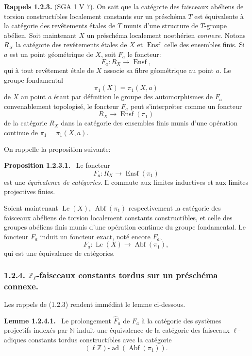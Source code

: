 \documentclass[11pt]{article}
\newenvironment{statement}[1]{\par\medskip\noindent\textbf{#1.}\ }{\par\medskip}
\providecommand{\Ensf}{\operatorname{Ensf}}
\providecommand{\Abf}{\operatorname{Abf}}
\providecommand{\Lc}{\operatorname{Lc}}
\providecommand{\ad}{\operatorname{ad}}
\begin{document}
\textbf{Rappels 1.2.3.} (SGA 1 V 7). On sait que la catégorie des faisceaux abéliens de torsion constructibles localement constants sur un préschéma \(T\) est équivalente à la catégorie des revêtements étales de \(T\) munis d'une structure de \(T\)-groupe abélien. Soit maintenant \(X\) un préschéma localement noethérien \emph{connexe}. Notons \(R_X\) la catégorie des revêtements étales de \(X\) et \(\Ensf\) celle des ensembles finis. Si \(a\) est un point géométrique de \(X\), soit \(F_a\) le foncteur:
\[
F_a:R_X\longrightarrow \Ensf,
\]
qui à
tout revêtement étale de \(X\) associe sa fibre géométrique au point \(a\). Le groupe fondamental
\[
\pi_1(X)=\pi_1(X,a)
\]
de \(X\) au point \(a\) étant par définition le groupe des automorphismes de \(F_a\) convenablement topologisé, le foncteur \(F_a\) peut s'interpréter comme un foncteur
\[
R_X\longrightarrow \Ensf(\pi_1)
\]
de la catégorie \(R_X\) dans la catégorie des ensembles finis munis d'une opération continue de \(\pi_1=\pi_1(X,a)\).

On rappelle la proposition suivante:

\begin{statement}{Proposition 1.2.3.1}
Le foncteur
\[
F_a:R_X\longrightarrow \Ensf(\pi_1)
\]
est une \emph{équivalence de catégories}. Il commute aux limites inductives et aux limites projectives finies.
\end{statement}

Soient maintenant \(\Lc(X)\), \(\Abf(\pi_1)\) respectivement la catégorie des faisceaux abéliens de torsion localement constants constructibles, et celle des groupes abéliens finis munis d'une opération continue du groupe fondamental. Le foncteur \(F_a\) induit un foncteur exact, noté encore \(F_a\),
\[
F_a:\Lc(X)\longrightarrow \Abf(\pi_1),
\]
qui est une équivalence de catégories.

\subsubsection*{1.2.4. \(\mathbb Z_\ell\)-faisceaux constants tordus sur un préschéma connexe.}

Les rappels de (1.2.3) rendent immédiat le lemme ci-dessous.

\begin{statement}{Lemme 1.2.4.1}
Le prolongement \(\widehat F_a\) de \(F_a\) à la catégorie des systèmes projectifs indexés par \(\mathbb N\) induit une équivalence de la catégorie des faisceaux \(\ell\)-adiques constants tordus constructibles avec la catégorie
\[
(\ell\mathbb Z)\text{-}\ad(\Abf(\pi_1)).
\]
\end{statement}
\end{document}
